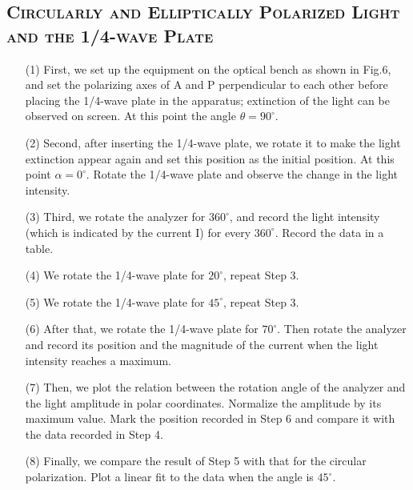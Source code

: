 \documentclass[a4paper,12pt]{article}
\begin{document}
\subsection{\textsc{Circularly and Elliptically Polarized Light and the 1/4-wave Plate}}
\begin{itemize}
\item[(1)] First, we set up the equipment on the optical bench as shown in Fig.6, and set the polarizing axes of A and P perpendicular to each other before placing the 1/4-wave plate in the apparatus; extinction of the light can be observed on screen. At this point the angle $\theta = 90^{\circ}$.


\item[(2)] Second, after inserting the 1/4-wave plate, we rotate it to make the light extinction appear again and set this position as the initial position. At this point $\alpha = 0^{\circ}$. Rotate the 1/4-wave plate and observe the change in the light intensity.

\item[(3)] Third, we rotate the analyzer for $ 360^{\circ}$, and record the light intensity (which is indicated by the current I) for every $ 360^{\circ}$. Record the data in a table.

\item[(4)] We rotate the 1/4-wave plate for $ 20^{\circ}$, repeat Step 3.

\item[(5)] We rotate the 1/4-wave plate for $ 45^{\circ}$, repeat Step 3.

\item[(6)] After that, we rotate the 1/4-wave plate for $ 70^{\circ}$. Then rotate the analyzer and record its position and the magnitude of the current when the light intensity reaches a maximum.

\item[(7)] Then, we plot the relation between the rotation angle of the analyzer and the light amplitude in polar coordinates. Normalize the amplitude by its maximum value. Mark the position recorded in Step 6 and compare it with the data recorded in Step 4.

\item[(8)] Finally, we compare the result of Step 5 with that for the circular polarization. Plot a linear fit to the data when the angle is $ 45^{\circ}$.
\end{itemize}

\end{document}
